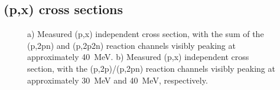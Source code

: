 


\subsection{(p,x) cross sections} 




\begin{figure}
    \centering
    \caption{a) Measured (p,x) independent cross section, with the sum of the (p,2pn) and (p,2p2n) reaction channels visibly peaking at approximately \mbox{40 MeV}.   b) Measured (p,x) independent cross section, with the (p,2p)/(p,2pn) reaction channels visibly peaking at approximately \mbox{30 MeV} and \mbox{40 MeV}, respectively.} 
     \label{fig:54Mn}
\end{figure}




